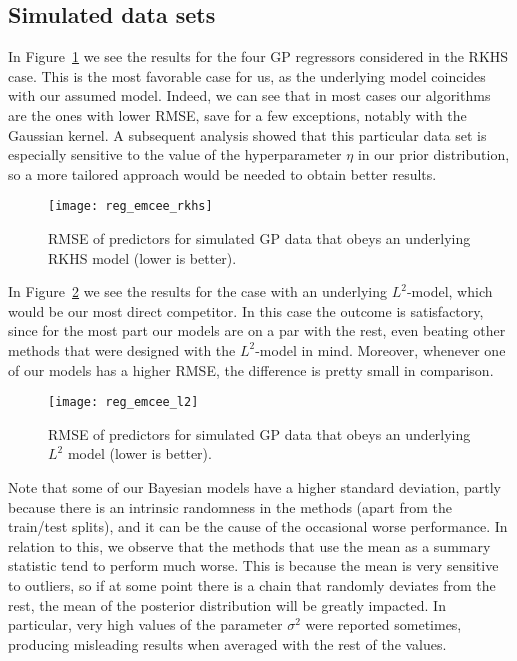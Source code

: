 \subsection*{Simulated data sets}

In Figure~\ref{fig:reg_emcee_rkhs} we see the results for the four GP regressors considered in the RKHS case. This is the most favorable case for us, as the underlying model coincides with our assumed model. Indeed, we can see that in most cases our algorithms are the ones with lower RMSE, save for a few exceptions, notably with the Gaussian kernel. A subsequent analysis showed that this particular data set is especially sensitive to the value of the hyperparameter \(\eta\) in our prior distribution, so a more tailored approach would be needed to obtain better results.

\begin{figure}[ht!]
  \centering
  \texttt{[image: reg\_emcee\_rkhs]}
  \caption{RMSE of predictors for simulated GP data that obeys an underlying RKHS model (lower is better).}\label{fig:reg_emcee_rkhs}
\end{figure}

In Figure~\ref{fig:reg_emcee_l2} we see the results for the case with an underlying \(L^2\)-model, which would be our most direct competitor. In this case the outcome is satisfactory, since for the most part our models are on a par with the rest, even beating other methods that were designed with the \(L^2\)-model in mind. Moreover, whenever one of our models has a higher RMSE, the difference is pretty small in comparison.
\begin{figure}[ht!]
  \centering
  \texttt{[image: reg\_emcee\_l2]}
  \caption{RMSE of predictors for simulated GP data that obeys an underlying \(L^2\) model (lower is better).}\label{fig:reg_emcee_l2}
\end{figure}

Note that some of our Bayesian models have a higher standard deviation, partly because there is an intrinsic randomness in the methods (apart from the train/test splits), and it can be the cause of the occasional worse performance. In relation to this, we observe that the methods that use the mean as a summary statistic tend to perform much worse. This is because the mean is very sensitive to outliers, so if at some point there is a chain that randomly deviates from the rest, the mean of the posterior distribution will be greatly impacted. In particular, very high values of the parameter \(\sigma^2\) were reported sometimes, producing misleading results when averaged with the rest of the values.

